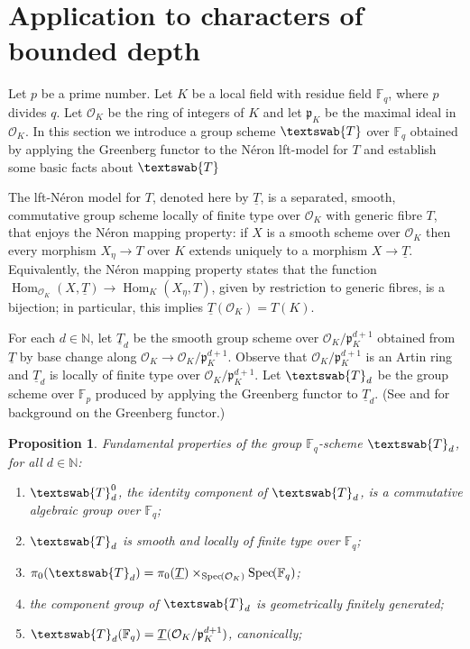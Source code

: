 \documentclass[11pt]{amsart}
\makeatletter
\theoremstyle{plain}
\newtheorem{proposition}[theorem]{Proposition}
\theoremstyle{definition}
\theoremstyle{remark}
\newcommand{\Spec}[1]{{\operatorname{Spec}\hskip-1pt( #1 )}}
\newcommand{\NN}{{\mathbb{N}}}
\newcommand{\OK}{\mathcal{O}_K}
\newcommand{\pK}{\mathfrak{p}_K}
\newcommand{\Fp}{\mathbb{F}_p}
\newcommand{\Fq}{{\mathbb{F}_q}}
\DeclareMathOperator{\Hom}{Hom}
\newcommand{\GN}[1]{\textswab{#1}}
\newcommand{\labitem}[2]{%
\def\@itemlabel{\textbf{#1}}
\item
\def\@currentlabel{#1}\label{#2}}
\makeatother
\begin{document}
\section{Application to characters of bounded depth}

%
Let $p$ be a prime number. Let $K$ be a local field with residue field $\Fq$, where $p$ divides $q$. Let $\OK$ be the ring of integers of $K$ and let $\pK$ be the maximal ideal in $\OK$.
%
In this section we introduce a group scheme $\GN{T}$ over $\Fq$ obtained by applying the Greenberg functor to the N\'eron lft-model for $T$ and establish some basic facts about $\GN{T}$


The lft-N\'eron model for $T$, denoted here by $\underline{T}$, is a separated, smooth, commutative group scheme locally of finite type over $\OK$ with generic fibre $T$, that enjoys the N\'eron mapping property: if $X$ is a smooth scheme over $\OK$ then every morphism $X_\eta \to T$ over $K$ extends uniquely to a morphism $X \to \underline{T}$. Equivalently, the N\'eron mapping property states that the function $\Hom_{\OK} (X,\underline{T}) \to \Hom_K(X_\eta,T)$, given by restriction to generic fibres, is a bijection; in particular, this implies $\underline{T}(\OK) = T(K)$.

For each $d\in \NN$, let $\underline{T}_{d}$ be the smooth group scheme over $\OK/\pK^{d+1}$ obtained from $\underline{T}$ by base change along $\OK \to \OK/\pK^{d+1}$. Observe that $\OK/\pK^{d+1}$ is an Artin ring and $\underline{T}_{d}$ is locally of finite type over $\OK/\pK^{d+1}$. 
%
Let $\GN{T}_{d}$ be the group scheme over $\Fp$ produced by applying the Greenberg functor to $\underline{T}_{d}$. (See \cite{Greenberg:2} and \cite[Ch. 9, \S 6]{BLR} for background on the Greenberg functor.) 

\begin{proposition}\label{prop:GN}
Fundamental properties of the group $\Fq$-scheme $\GN{T}_d$, for all $d\in \NN$:
\begin{enumerate}
 \labitem{(GNd.0)}{GN0} $\GN{T}_d^0$, the identity component of $\GN{T}_d$, is a commutative algebraic group over $\Fq$;
\labitem{(GNd.1)}{GNd} $\GN{T}_d$ is smooth and locally of finite type over $\Fq$;
\labitem{(GNd.2)}{pi0} $\pi_0(\GN{T}_d) = \pi_0(\underline{T}) \times_{\Spec{\OK}} \Spec{\Fq}$;
\labitem{(GNd.3)}{fg} the component group of $\GN{T}_d$ is geometrically finitely generated;
\labitem{(GNd.4)}{dFq} $\GN{T}_d(\Fq) = \underline{T}(\OK/\pK^{d+1})$, canonically;
\end{enumerate}
\end{proposition}
\end{document}
